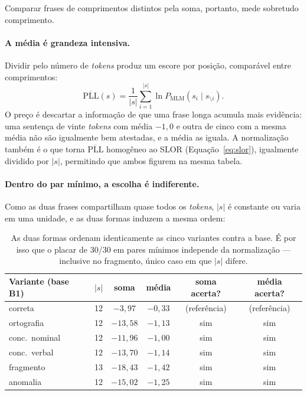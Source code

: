 \documentclass[11pt,a4paper]{article}
\newcommand{\dimtable}[1]{\small #1}
\begin{document}
\noindent Comparar frases de comprimentos distintos pela soma, portanto, mede sobretudo comprimento.

\paragraph{A média é grandeza intensiva.} Dividir pelo número de \textit{tokens} produz um escore
por posição, comparável entre comprimentos:
\begin{equation}
\overline{\mathrm{PLL}}(s) = \frac{1}{|s|}\sum_{i=1}^{|s|} \ln P_{\mathrm{MLM}}(s_i \mid s_{\setminus i}).
\label{eq:pllmedia}
\end{equation}
O preço é descartar a informação de que uma frase longa acumula mais evidência: uma sentença de
vinte \textit{tokens} com média $-1{,}0$ e outra de cinco com a mesma média não são igualmente bem
atestadas, e a média as iguala. A normalização também é o que torna $\overline{\mathrm{PLL}}$
homogêneo ao SLOR (Equação~\ref{eq:slor}), igualmente dividido por $|s|$, permitindo que ambos
figurem na mesma tabela.

\paragraph{Dentro do par mínimo, a escolha é indiferente.} Como as duas frases compartilham quase
todos os \textit{tokens}, $|s|$ é constante ou varia em uma unidade, e as duas formas induzem a
mesma ordem:

\begin{table}[H]
\centering
\dimtable{
\begin{tabular}{@{}lccccc@{}}
\toprule
\textbf{Variante (base B1)} & \textbf{$|s|$} & \textbf{soma} & \textbf{média} & \textbf{soma acerta?} & \textbf{média acerta?} \\
\midrule
correta        & 12 & $-3{,}97$  & $-0{,}33$ & (referência) & (referência) \\
ortografia     & 12 & $-13{,}58$ & $-1{,}13$ & sim & sim \\
conc.\ nominal & 12 & $-11{,}96$ & $-1{,}00$ & sim & sim \\
conc.\ verbal  & 12 & $-13{,}70$ & $-1{,}14$ & sim & sim \\
fragmento      & 13 & $-18{,}43$ & $-1{,}42$ & sim & sim \\
anomalia       & 12 & $-15{,}02$ & $-1{,}25$ & sim & sim \\
\bottomrule
\end{tabular}}
\caption{As duas formas ordenam identicamente as cinco variantes contra a base. É por isso que o
placar de 30/30 em pares mínimos independe da normalização --- inclusive no fragmento, único caso
em que $|s|$ difere.}
\label{tab:pllpares}
\end{table}
\end{document}
